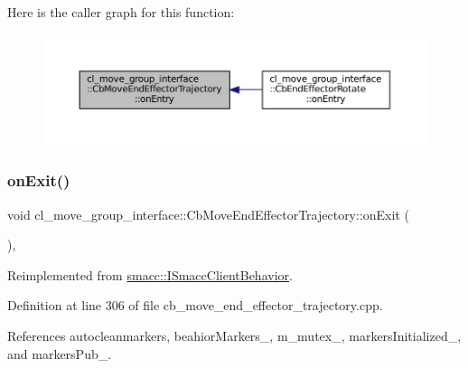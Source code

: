 Here is the caller graph for this function\+:
\nopagebreak
\begin{figure}[H]
\begin{center}
\leavevmode
\includegraphics[width=350pt]{classcl__move__group__interface_1_1CbMoveEndEffectorTrajectory_aaedd074fd178c6390a4a3f1ccff23ad3_icgraph}
\end{center}
\end{figure}
\mbox{\label{classcl__move__group__interface_1_1CbMoveEndEffectorTrajectory_a4952c092e69bc6e9831568de32888da5}} 
\subsubsection{\texorpdfstring{on\+Exit()}{onExit()}}
{\footnotesize\ttfamily void cl\+\_\+move\+\_\+group\+\_\+interface\+::\+Cb\+Move\+End\+Effector\+Trajectory\+::on\+Exit (\begin{DoxyParamCaption}{ }\end{DoxyParamCaption})\hspace{0.3cm}{\ttfamily [override]}, {\ttfamily [virtual]}}



Reimplemented from \hyperlink{classsmacc_1_1ISmaccClientBehavior_a36bf771905e3bf750909a15e4215a9b3}{smacc\+::\+I\+Smacc\+Client\+Behavior}.



Definition at line 306 of file cb\+\_\+move\+\_\+end\+\_\+effector\+\_\+trajectory.\+cpp.



References autocleanmarkers, beahior\+Markers\+\_\+, m\+\_\+mutex\+\_\+, markers\+Initialized\+\_\+, and markers\+Pub\+\_\+.


